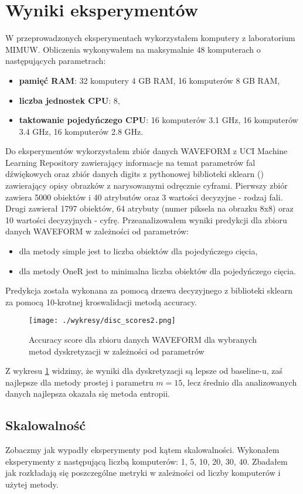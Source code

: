 \documentclass[magisterska]{pracamgr}
\theoremstyle{plain}
\theoremstyle{definition}
\theoremstyle{remark}
\begin{document}
\section{Wyniki eksperymentów}
W przeprowadzonych eksperymentach wykorzystałem komputery z laboratorium MIMUW. Obliczenia wykonywałem 
na maksymalnie 48 komputerach o następujących parametrach:
  \begin{itemize}
   \item \textbf{pamięć RAM}: 32 komputery 4 GB RAM, 16 komputerów 8 GB RAM,
   \item \textbf{liczba jednostek CPU}: 8,
   \item \textbf{taktowanie pojedyńczego CPU}: 16 komputerów 3.1 GHz, 16 komputerów 3.4 GHz, 16 komputerów 2.8 GHz.
  \end{itemize}
Do eksperymentów wykorzystałem zbiór danych WAVEFORM z UCI Machine Learning Repository 
zawierający informacje na temat parametrów fal dźwiękowych oraz zbiór danych digits z pythonowej biblioteki sklearn (\cite{SklearnDocumentation})
zawierający opisy obrazków z narysowanymi odręcznie cyframi.
Pierwszy zbiór zawiera 5000 obiektów i 40 atrybutów oraz 3 wartości decyzyjne - rodzaj fali.
Drugi zawierał 1797 obiektów, 64 atrybuty (numer piksela na obrazku 8x8) oraz 10 wartości decyzyjnych - cyfrę.
Przeanalizowałem wyniki predykcji dla zbioru danych WAVEFORM w zależności od parametrów:
  \begin{itemize}
   \item dla metody simple jest to liczba obiektów dla pojedyńczego cięcia,
   \item dla metody OneR jest to minimalna liczba obiektów dla pojedyńczego cięcia.
  \end{itemize}

Predykcja została wykonana za pomocą drzewa decyzyjnego z biblioteki sklearn za pomocą 10-krotnej
kroswalidacji metodą accuracy.

\begin{figure}\label{fig:disc_scores}
 \caption{Accuracy score dla zbioru danych WAVEFORM dla wybranych metod dyskretyzacji w zależności od parametrów}
 \centering\texttt{[image: ./wykresy/disc\_scores2.png]}
\end{figure}

Z wykresu \ref{fig:disc_scores} widzimy, że wyniki dla dyskretyzacji są lepsze od baseline-u, 
zaś najlepsze dla metody prostej i parametru $m = 15$, lecz 
średnio dla analizowanych danych najlepsza okazała się metoda entropii.
\subsection{Skalowalność}
Zobaczmy jak wypadły eksperymenty pod kątem skalowalności. Wykonałem eksperymenty z następującą liczbą komputerów: 1, 5, 10, 20, 30, 40.
Zbadałem jak rozkładają się poszczególne metryki w zależności od liczby komputerów i użytej metody.
\end{document}
